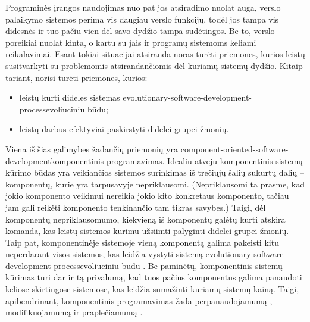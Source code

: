 

Programinės įrangos naudojimas nuo pat jos atsiradimo nuolat auga,
verslo palaikymo sistemos perima vis daugiau verslo funkcijų, todėl
jos tampa vis didesnės ir tuo pačiu vien dėl savo dydžio tampa
sudėtingos. Be to, verslo poreikiai nuolat kinta, o kartu su jais
ir programų sistemoms keliami reikalavimai. Esant tokiai situacijai
atsiranda noras turėti priemones, kurios leistų susitvarkyti
su problemomis atsirandančiomis dėl kuriamų sistemų dydžio. Kitaip
tariant, norisi turėti priemones, kurios:
\begin{itemize}
  \item leistų kurti dideles sistemas
    \gls{evolutionary-software-development-process}{evoliuciniu būdu};
  \item leistų darbus efektyviai paskirstyti didelei grupei žmonių.
\end{itemize}

Viena iš šias galimybes žadančių priemonių yra
\gls{component-oriented-software-development}{komponentinis programavimas}.
Idealiu atveju komponentinis sistemų kūrimo būdas yra veikiančios
sistemos surinkimas iš trečiųjų šalių sukurtų dalių –
komponentų, kurie yra tarpusavyje nepriklausomi. (Nepriklausomi ta
prasme, kad jokio komponento veikimui nereikia jokio kito konkretaus
komponento, tačiau jam gali reikėti komponento tenkinančio tam
tikras savybes.) Taigi, dėl komponentų nepriklausomumo, kiekvieną iš
komponentų galėtų kurti atskira komanda, kas leistų sistemos kūrimu
užsiimti palyginti didelei grupei žmonių. Taip pat, komponentinėje
sistemoje vieną komponentą galima pakeisti kitu neperdarant visos
sistemos, kas leidžia vystyti sistemą
\gls{evolutionary-software-development-process}{evoliuciniu būdu}%
\cite[6]{cs-beyond-object-oriented-programming}. Be paminėtų,
komponentinis sistemų kūrimas turi dar ir tą privalumą, kad tuos
pačius komponentus galima panaudoti keliose skirtingose sistemose, kas
leidžia sumažinti kuriamų sistemų
kainą\cite[6]{cs-beyond-object-oriented-programming}. Taigi,
apibendrinant, komponentinis programavimas žada perpanaudojamumą
, modifikuojamumą  ir praplečiamumą
 \cites{what-to-compose}{point-counterpoint}.

